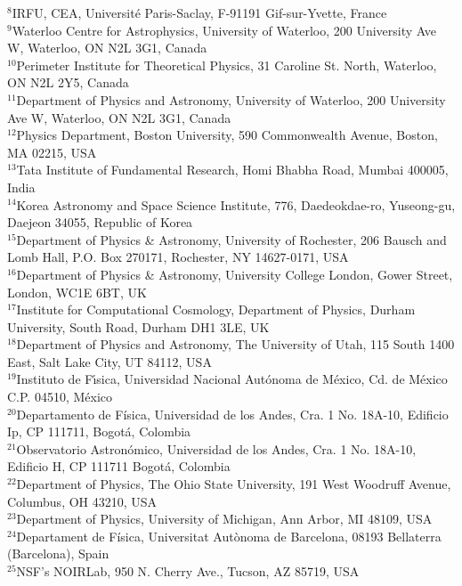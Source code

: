 {$^{8}$IRFU, CEA, Universit\'{e} Paris-Saclay, F-91191 Gif-sur-Yvette, France\\ 
$^{9}$Waterloo Centre for Astrophysics, University of Waterloo, 200 University Ave W, Waterloo, ON N2L 3G1, Canada\\ 
$^{10}$Perimeter Institute for Theoretical Physics, 31 Caroline St. North, Waterloo, ON N2L 2Y5, Canada\\ 
$^{11}$Department of Physics and Astronomy, University of Waterloo, 200 University Ave W, Waterloo, ON N2L 3G1, Canada\\ 
$^{12}$Physics Department, Boston University, 590 Commonwealth Avenue, Boston, MA 02215, USA\\ 
$^{13}$Tata Institute of Fundamental Research, Homi Bhabha Road, Mumbai 400005, India\\ 
$^{14}$Korea Astronomy and Space Science Institute, 776, Daedeokdae-ro, Yuseong-gu, Daejeon 34055, Republic of Korea\\ 
$^{15}$Department of Physics \& Astronomy, University of Rochester, 206 Bausch and Lomb Hall, P.O. Box 270171, Rochester, NY 14627-0171, USA\\ 
$^{16}$Department of Physics \& Astronomy, University College London, Gower Street, London, WC1E 6BT, UK\\ 
$^{17}$Institute for Computational Cosmology, Department of Physics, Durham University, South Road, Durham DH1 3LE, UK\\ 
$^{18}$Department of Physics and Astronomy, The University of Utah, 115 South 1400 East, Salt Lake City, UT 84112, USA\\ 
$^{19}$Instituto de F\'{\i}sica, Universidad Nacional Aut\'{o}noma de M\'{e}xico,  Cd. de M\'{e}xico  C.P. 04510,  M\'{e}xico\\ 
$^{20}$Departamento de F\'isica, Universidad de los Andes, Cra. 1 No. 18A-10, Edificio Ip, CP 111711, Bogot\'a, Colombia\\ 
$^{21}$Observatorio Astron\'omico, Universidad de los Andes, Cra. 1 No. 18A-10, Edificio H, CP 111711 Bogot\'a, Colombia\\ 
$^{22}$Department of Physics, The Ohio State University, 191 West Woodruff Avenue, Columbus, OH 43210, USA\\ 
$^{23}$Department of Physics, University of Michigan, Ann Arbor, MI 48109, USA\\
$^{24}$Departament de F\'{i}sica, Universitat Aut\`{o}noma de Barcelona, 08193 Bellaterra (Barcelona), Spain\\ 
$^{25}$NSF's NOIRLab, 950 N. Cherry Ave., Tucson, AZ 85719, USA\\ 
}
